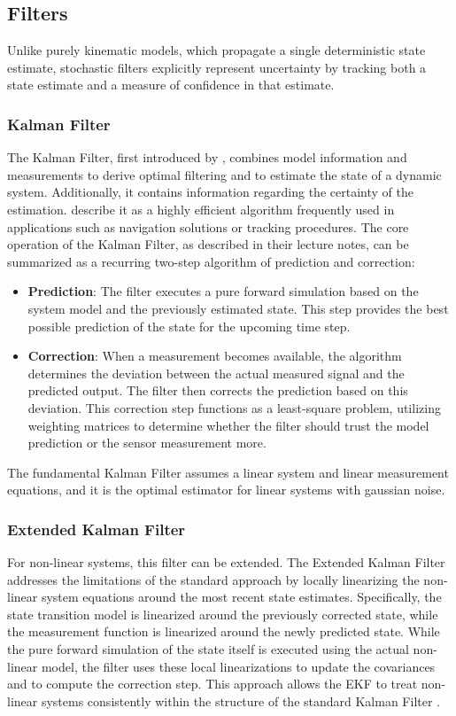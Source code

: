 \subsection{Filters} 
Unlike purely kinematic models, which propagate a single deterministic state estimate, stochastic filters explicitly represent uncertainty by tracking both a state estimate and a measure of confidence in that estimate.

\subsubsection{Kalman Filter}
\label{subsec:kalmanfilterbackground}
The Kalman Filter, first introduced by \textcite{Kalman1960}, combines model information and measurements to derive optimal filtering and to estimate the state of a dynamic system. Additionally, it contains information regarding the certainty of the estimation. \cite{ValleryDoerschel2025RTSkript} describe it as a highly efficient algorithm frequently used in applications such as navigation solutions or tracking procedures. The core operation of the Kalman Filter, as described in their lecture notes, can be summarized as a recurring two-step algorithm of prediction and correction:
\begin{itemize}
    \item \textbf{Prediction}: The filter executes a pure forward simulation based on the system model and the previously estimated state. This step provides the best possible prediction of the state for the upcoming time step.
    \item \textbf{Correction}: When a measurement becomes available, the algorithm determines the deviation between the actual measured signal and the predicted output. The filter then corrects the prediction based on this deviation. This correction step functions as a least-square problem, utilizing weighting matrices to determine whether the filter should trust the model prediction or the sensor measurement more.
\end{itemize}
The fundamental Kalman Filter assumes a linear system and linear measurement equations, and it is the optimal estimator for linear systems with gaussian noise.


\subsubsection{Extended Kalman Filter}

For non-linear systems, this filter can be extended. The Extended Kalman Filter \parencite{Schmidt1966EKF} addresses the limitations of the standard approach by locally linearizing the non-linear system equations around the most recent state estimates. Specifically, the state transition model is linearized around the previously corrected state, while the measurement function is linearized around the newly predicted state. While the pure forward simulation of the state itself is executed using the actual non-linear model, the filter uses these local linearizations to update the covariances and to compute the correction step. This approach allows the EKF to treat non-linear systems consistently within the structure of the standard Kalman Filter \parencite[445]{ValleryDoerschel2025RTSkript}.


